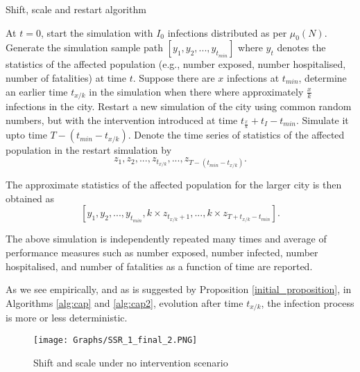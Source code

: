 \documentclass{article}
\theoremstyle{definition}
\begin{document}
\begin{algorithm}
\caption{Shift, scale and restart algorithm}\label{alg:cap2}
\begin{algorithmic}[1]
\State   At $t=0$, start the simulation with $I_0$ infections distributed as per $\mu_0(N)$.
 Generate the simulation sample path  
 $[y_1,y_2,...,y_{t_{min}}]$ where $y_t$ denotes the statistics of the affected population (e.g., number exposed, number hospitalised, 
 number of fatalities)  at time $t$. 
 \bigskip
 \State Suppose there are $x$ infections at $t_{min}$, determine an earlier time $t_{x/k}$ in the
  simulation when there where approximately $\frac{x}{k}$ infections in the city. 
 \bigskip
 \State Restart 
 a new simulation of the city using common random numbers, but with the intervention introduced 
 at time $t_{\frac{x}{k}}+t_{I}-t_{min}$. Simulate it upto time $T-(t_{min}-t_{x/k})$. 
Denote the time series of statistics of the affected population in the restart simulation
by \[z_1,z_2,...,z_{t_{x/k}},...,z_{T-(t_{min}-t_{x/k})}.\]
 
 \bigskip
 \State  The approximate statistics of the affected population for the larger city is then obtained as   
 \[
 [y_1,y_2,...,y_{t_{min}},k \times z_{t_{x/k}+1},...,k \times z_{T+t_{x/k}-t_{min}}]
 .\]
  \bigskip

\State 
The above simulation is independently repeated many times and average of performance measures such as number exposed, number infected, number hospitalised, and number of fatalities as a function of time are reported.
\end{algorithmic}
\end{algorithm}


As we see empirically, 
and as is suggested by Proposition \ref{initial_proposition}, in Algorithms \ref{alg:cap} and \ref{alg:cap2}, evolution after time $t_{x/k}$, the infection process is 
 more or less deterministic.  
 
 
 
 
 \begin{figure}
      \centering
  \texttt{[image: Graphs/SSR\_1\_final\_2.PNG]}   
    \caption{ Shift and scale under no intervention scenario} 
    \label{SSR_1_final_1}
  \end{figure}
  
\end{document}
